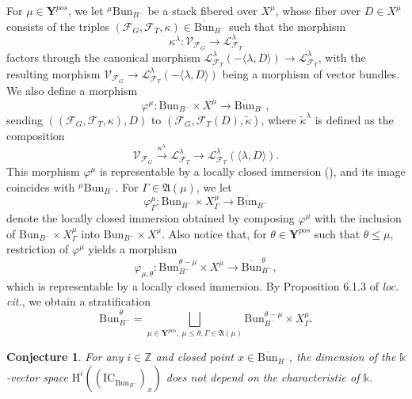 \documentclass[11pt]{amsart}
\theoremstyle{plain}
\newtheorem{conj}{Conjecture}[section]
\theoremstyle{remark}
\numberwithin{equation}{section}
\begin{document}
	For $\mu\in \mathbf{Y}^{pos}$, we let $^\mu\mathrm{Bun}_{B^-}$ be a stack fibered over $X^\mu$, whose fiber over $D\in X^\mu$ consists of the triples $(\mathcal{F}_G,\mathcal{F}_T,\kappa)\in\overline{\mathrm{Bun}}_{B^-}$ such that the morphism 
	$$\kappa^\lambda:\mathcal{V}_{\mathcal{F}_G}\to \mathcal{L}^\lambda_{\mathcal{F}_T}$$
	factors through the canonical morphism $\mathcal{L}^\lambda_{\mathcal{F}_T}(-\langle \lambda,D\rangle)\to \mathcal{L}^\lambda_{\mathcal{F}_T}$, with the resulting morphism $\mathcal{V}_{\mathcal{F}_G}\to\mathcal{L}^\lambda_{\mathcal{F}_T}(-\langle \lambda,D\rangle)$ being a morphism of vector bundles. We also define a morphism
	$$\varphi^\mu:\mathrm{Bun}_{B^-}\times X^\mu\to  \overline{\mathrm{Bun}}_{B^-},$$
	sending $((\mathcal{F}_G,\mathcal{F}_T,\kappa),D)$ to $(\mathcal{F}_G,\mathcal{F}_T(D),\tilde{\kappa})$, where $\tilde{\kappa}^\lambda$ is defined as the composition 
	$$\mathcal{V}_{\mathcal{F}_G}\xrightarrow{\kappa^\lambda} \mathcal{L}^\lambda_{\mathcal{F}_T}\to \mathcal{L}^\lambda_{\mathcal{F}_T}(\langle\lambda,D\rangle). $$
	This morphism $\varphi^\mu$ is representable by a locally closed immersion (\cite[Proposition 6.1.2]{BG}), and its image coincides with $^\mu\mathrm{Bun}_{B^-}$. For $\Gamma\in\mathfrak{A}(\mu)$, we let 
	$$\varphi^\mu_\Gamma:\mathrm{Bun}_{B^-}\times X^\mu_\Gamma\to  \overline{\mathrm{Bun}}_{B^-}$$ denote the locally closed immersion obtained by composing $\varphi^\mu$ with the inclusion of $\mathrm{Bun}_{B^-}\times X^\mu_\Gamma$ into $\mathrm{Bun}_{B^-}\times X^\mu$. 
	Also notice that, for $\theta\in\mathbf{Y}^{pos}$ such that $\theta\leq \mu$, restriction of $\varphi^\mu$ yields a morphism 
	$$\varphi_{\mu,\theta}:{\mathrm{Bun}}_{B^-}^{\theta-\mu}\times X^\mu\to  \overline{\mathrm{Bun}}^\theta_{B^-}, $$
	which is representable by a locally closed immersion. By Proposition 6.1.3 of \textit{loc. cit.}, we obtain a stratification
	\begin{equation}\label{strat bun}
		\overline{\mathrm{Bun}}_{B^-}^\theta=\bigsqcup_{\mu\in\mathbf{Y}^{pos},~\mu\leq \theta,\Gamma \in\mathfrak{A}(\mu)}{\mathrm{Bun}}_{B^-}^{\theta-\mu}\times X_\Gamma^\mu.
	\end{equation} 
\begin{conj}\label{conj stalks independance}
    For any $i\in\mathbb{Z}$ and closed point $x\in \overline{\mathrm{Bun}}_{B^-}$, the dimension of the $\mathbb{k}$-vector space $\mathrm{H}^i((\mathrm{IC}_{\overline{\mathrm{Bun}}_{B^-}})_x)$ does not depend on the characteristic of $\mathbb{k}$.
\end{conj}
	
\end{document}
